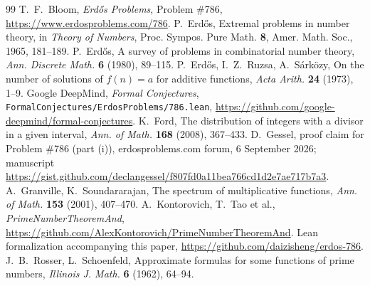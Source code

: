 \documentclass[11pt]{amsart}
\theoremstyle{definition}
\theoremstyle{remark}
\begin{document}
\begin{thebibliography}{99}
 T.~F.~Bloom, \emph{Erd\H{o}s Problems}, Problem \#786, \url{https://www.erdosproblems.com/786}.
 P.~Erd\H{o}s, Extremal problems in number theory, in \emph{Theory of Numbers}, Proc. Sympos. Pure Math. \textbf{8}, Amer. Math. Soc., 1965, 181--189.
 P.~Erd\H{o}s, A survey of problems in combinatorial number theory, \emph{Ann. Discrete Math.} \textbf{6} (1980), 89--115.
 P.~Erd\H{o}s, I.~Z.~Ruzsa, A.~S\'ark\"ozy, On the number of solutions of $f(n)=a$ for additive functions, \emph{Acta Arith.} \textbf{24} (1973), 1--9.
 Google DeepMind, \emph{Formal Conjectures}, \texttt{FormalConjectures/ErdosProblems/786.lean}, \url{https://github.com/google-deepmind/formal-conjectures}.
 K.~Ford, The distribution of integers with a divisor in a given interval, \emph{Ann. of Math.} \textbf{168} (2008), 367--433.
 D.~Gessel, proof claim for Problem \#786 (part (i)), erdosproblems.com forum, 6 September 2026; manuscript \url{https://gist.github.com/declangessel/f807fd0a11bea766cd1d2e7ae717b7a3}.
 A.~Granville, K.~Soundararajan, The spectrum of multiplicative functions, \emph{Ann. of Math.} \textbf{153} (2001), 407--470.
 A.~Kontorovich, T.~Tao et al., \emph{PrimeNumberTheoremAnd}, \url{https://github.com/AlexKontorovich/PrimeNumberTheoremAnd}.
 Lean formalization accompanying this paper, \url{https://github.com/daizisheng/erdos-786}.
 J.~B.~Rosser, L.~Schoenfeld, Approximate formulas for some functions of prime numbers, \emph{Illinois J. Math.} \textbf{6} (1962), 64--94.
\end{thebibliography}
\end{document}
